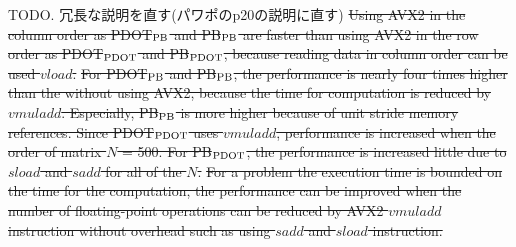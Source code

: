 \documentclass{IOS-Book-Article}
\begin{document}
{  {}



TODO. 冗長な説明を直す(パワポのp20の説明に直す)
\sout{Using AVX2 in the column order as PDOT$_{\rm{PB}}$ and PB$_{\rm{PB}}$ are faster than using AVX2 in the row order as PDOT$_{\rm{PDOT}}$ and PB$_{\rm{PDOT}}$, because reading data in column order can be used $vload$.}
\sout{For PDOT$_{\rm{PB}}$ and PB$_{\rm{PB}}$, the performance is nearly four times higher than the without using AVX2, because the time for computation is reduced by $vmuladd$. Especially, PB$_{\rm{PB}}$ is more higher because of unit stride memory references. Since PDOT$_{\rm{PDOT}}$ uses $vmuladd$, performance is increased when the order of matrix $N$ = 500. For PB$_{\rm{PDOT}}$, the performance is increased little due to $sload$ and $sadd$ for all of the $N$.}
\sout{For a problem the execution time is bounded on the time for the computation, the performance can be improved when the number of floating-point operations can be reduced by AVX2 $vmuladd$ instruction without overhead such as using $sadd$ and $sload$ instruction.}

}
\end{document}
